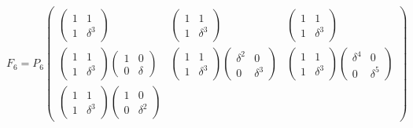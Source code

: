 \[
    F_6
    = P_6
    \begin{pmatrix}
        \begin{pmatrix}
            1 & 1        \\
            1 & \delta^3
        \end{pmatrix}
         &
        \begin{pmatrix}
            1 & 1        \\
            1 & \delta^3
        \end{pmatrix}
         &
        \begin{pmatrix}
            1 & 1        \\
            1 & \delta^3
        \end{pmatrix}
        \\
        \begin{pmatrix}
            1 & 1        \\
            1 & \delta^3
        \end{pmatrix}
        \begin{pmatrix}
            1 & 0      \\
            0 & \delta
        \end{pmatrix}
         &
        \begin{pmatrix}
            1 & 1        \\
            1 & \delta^3
        \end{pmatrix}
        \begin{pmatrix}
            \delta^2 & 0        \\
            0        & \delta^3
        \end{pmatrix}
         &
        \begin{pmatrix}
            1 & 1        \\
            1 & \delta^3
        \end{pmatrix}
        \begin{pmatrix}
            \delta^4 & 0        \\
            0        & \delta^5
        \end{pmatrix}
        \\
        \begin{pmatrix}
            1 & 1        \\
            1 & \delta^3
        \end{pmatrix}
        \begin{pmatrix}
            1 & 0        \\
            0 & \delta^2
        \end{pmatrix}

\end{pmatrix}\]
